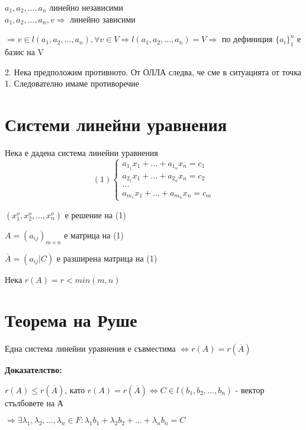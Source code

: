 \documentclass[fleqn,12pt]{article}
\begin{document}
\begin{flushleft}
        $a_1, a_2, ..., a_n $ линейно независими\\
        $a_1, a_2, ..., a_n, v \Rightarrow $  линейно зависими
            
        $\Rightarrow v \in l(a_1, a_2, ..., a_n), \forall v \in V \Rightarrow l(a_1, a_2, ..., a_n) = V \Rightarrow $ по дефиниция $ \{a_i\}_1^n $ е базис на V

        \vspace{5mm}
    
        2. Нека предположим противното. От ОЛЛА следва, че сме в ситуацията от точка 1. Следователно имаме противоречие
        
    
    \vspace{5mm}
    
    
\section{Системи линейни уравнения}
Нека е дадена система линейни уравнения
\begin{equation*}
    (1)\begin{cases}
        a_{1_1}x_1+...+a_{1_n}x_n = c_1\\
        a_{2_1}x_1+...+a_{2_n}x_n = c_2\\
        ...\\
        a_{m_1}x_1+...+a_{m_n}x_n = c_m
    \end{cases}
\end{equation*}

$(x_1^o, x_2^o, ..., x_n^o)$ е решение на (1)

$ A = (a_{ij})_{m \times n} $ е матрица на (1)

$ \overline{A} = (a_{ij} | C) $ е разширена матрица на (1)

Нека $ r(A) = r < min(m, n) $


\section{Теорема на Руше}
Една система линейни уравнения е съвместима $ \Leftrightarrow r(A) = r(\overline{A}) $

\vspace{5mm}
    
    \textbf{Доказателство:}

    $ r(A) \leq r(\overline{A})$, като $ r(A) = r(\overline{A}) \Leftrightarrow C \in l(b_1, b_2, ..., b_n)$ - вектор стълбовете на А

    $ \Rightarrow \exists \lambda_1, \lambda_2, ..., \lambda_n \in F: \lambda_1 b_1 + \lambda_2 b_2 + ... + \lambda_n b_n = C $


\end{flushleft}
\end{document}
